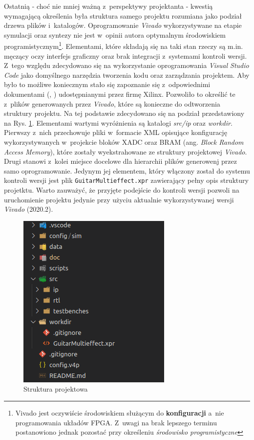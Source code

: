 Ostatnią - choć nie mniej ważną z~perspektywy projektanta - kwestią wymagającą określenia była struktura samego projektu rozumiana jako podział drzewa plików i~katalogów. Oprogramowanie \textit{Vivado} wykorzystywane na etapie symulacji oraz syntezy nie jest w~opinii autora optymalnym środowiskiem programistycznym\footnote{Vivado jest oczywiście środowiskiem służącym do \textbf{konfiguracji} a~nie programowania układów FPGA. Z~uwagi na brak lepszego terminu postanowiono jednak pozostać przy określeniu \textit{środowisko programistyczne}}. Elementami, które składają się na taki stan rzeczy są m.in. męczący oczy interfejs graficzny oraz brak integracji z~systemami kontroli wersji. Z~tego względu zdecydowano się na wykorzystanie oprogramowania \textit{Visual Studio Code} jako domyślnego narzędzia tworzenia kodu oraz zarządzania projektem. Aby było to możliwe koniecznym stało się zapoznanie się z~odpowiednimi dokumentami (\cite{vivado_design_flow}, \cite{vivado_design_methodology}) udostępnianymi przez firmę Xilinx. Pozwoliło to określić te z~plików generowanych przez \textit{Vivado}, które są konieczne do odtworzenia struktury projektu. Na tej podstawie zdecydowano się na podział przedstawiony na Rys. \ref{project-structure}. Elementami wartymi wyróżnienia są katalogi \textit{src/ip} oraz \textit{workdir}. Pierwszy z~nich przechowuje pliki w~formacie XML opisujące konfigurację wykorzystywanych w~projekcie bloków XADC oraz BRAM (ang. \textit{Block Random Access Memory}), które zostały wyekstrahowane ze struktury projektowej \textit{Vivado}. Drugi stanowi z~kolei miejsce docelowe dla hierarchii plików generowenj przez samo oprogramowanie. Jedynym jej elementem, który włączony został do systemu kontroli wersji jest plik \verb|GuitarMultieffect.xpr| zawierający pełny opis struktury projetktu. Warto zauważyć, że przyjęte podejście do kontroli wersji pozwoli na uruchomienie projektu jedynie przy użyciu aktualnie wykorzystywanej wersji \textit{Vivado} (2020.2).

\vspace{0.5cm}
\begin{figure}[ht]
    \centering
    \includegraphics[scale=0.7]{img/source_structure.png}
    \captionsetup{format=plain,justification=centering}
    \caption{Struktura projektowa}
    \label{project-structure}
\end{figure}
\vspace{0.5cm}
